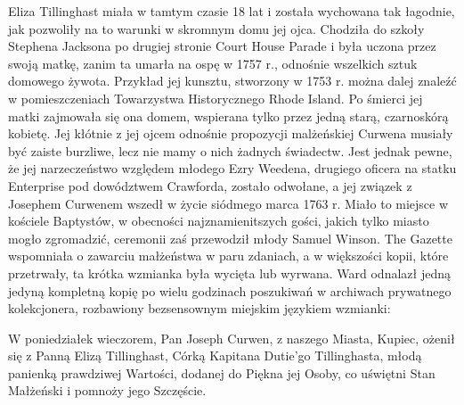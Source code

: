 Eliza Tillinghast miała w tamtym czasie 18 lat i została wychowana tak łagodnie, jak pozwoliły na to warunki w skromnym domu jej ojca. Chodziła do szkoły Stephena Jacksona po drugiej stronie Court House Parade i była uczona przez swoją matkę, zanim ta umarła na ospę w 1757 r., odnośnie wszelkich sztuk domowego żywota. Przykład jej kunsztu, stworzony w 1753 r. można dalej znaleźć w pomieszczeniach Towarzystwa Historycznego Rhode Island. Po śmierci jej matki zajmowała się ona domem, wspierana tylko przez jedną starą, czarnoskórą kobietę. Jej kłótnie z jej ojcem odnośnie propozycji malżeńskiej Curwena musiały być zaiste burzliwe, lecz nie mamy o nich żadnych świadectw. Jest jednak pewne, że jej narzeczeństwo względem młodego Ezry Weedena, drugiego oficera na statku Enterprise pod dowództwem Crawforda, zostało odwołane, a jej związek z Josephem Curwenem wszedł w życie siódmego marca 1763 r. Miało to miejsce w kościele Baptystów, w obecności najznamienitszych gości, jakich tylko miasto mogło zgromadzić, ceremonii zaś przewodził młody Samuel Winson. The Gazette wspomniała o zawarciu małżeństwa w paru zdaniach, a w większości kopii, które przetrwały, ta krótka wzmianka była wycięta lub wyrwana. Ward odnalazł jedną jedyną kompletną kopię po wielu godzinach poszukiwań w archiwach prywatnego kolekcjonera, rozbawiony bezsensownym miejskim językiem wzmianki:

\begin{displayquote}

W poniedziałek wieczorem, Pan Joseph Curwen, z naszego Miasta, Kupiec, ożenił się z Panną Elizą Tillinghast, Córką Kapitana Dutie'go Tillinghasta, młodą panienką prawdziwej Wartości, dodanej do Piękna jej Osoby, co uświętni Stan Małżeński i pomnoży jego Szczęście.

\end{displayquote}

